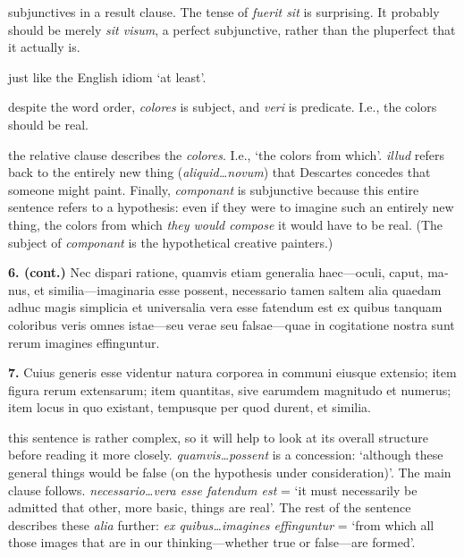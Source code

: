 subjunctives in a result clause. The tense of \textit{fuerit sit} is surprising. It probably should be merely \textit{sit visum}, a perfect subjunctive, rather than the pluperfect that it actually is.

 just like the English idiom `at least'.

 despite the word order, \textit{colores} is subject, and \textit{veri} is predicate. I.e., the colors should be real.

 the relative clause describes the \textit{colores}. I.e., `the colors from which'. \textit{illud} refers back to the entirely new thing (\textit{aliquid\dots novum}) that Descartes concedes that someone might paint. Finally, \textit{componant} is subjunctive because this entire sentence refers to a hypothesis: even if they were to imagine such an entirely new thing, the colors from which \textit{they would compose} it would have to be real. (The subject of \textit{componant} is the hypothetical creative painters.)

\clearpage

\beginnumbering
\pstart
{}
\begin{latin}
    \textenglish{\textbf{6. (cont.)}} Nec dispari ratione, quamvis etiam generalia haec---oculi, caput, manus, et similia---imaginaria esse possent, necessario tamen saltem alia quaedam adhuc magis simplicia et universalia vera esse fatendum est ex quibus tanquam coloribus veris omnes istae---seu verae seu falsae---quae in cogitatione nostra sunt rerum imagines effinguntur.
\end{latin}
\pend
\endnumbering

\beginnumbering
\pstart
\begin{latin}
   \textenglish{\textbf{7.}} Cuius generis esse videntur natura corporea in communi eiusque extensio; item figura rerum extensarum; item quantitas, sive earumdem magnitudo et numerus; item locus in quo existant, tempusque per quod durent, et similia.
\end{latin}
\pend
\endnumbering

\prenotes

 this sentence is rather complex, so it will help to look at its overall structure before reading it more closely. \textit{quamvis\dots possent} is a concession: `although these general things would be false (on the hypothesis under consideration)'. The main clause follows. \textit{necessario\dots vera esse fatendum est} = `it must necessarily be admitted that other, more basic, things are real'. The rest of the sentence describes these \textit{alia} further: \textit{ex quibus\dots imagines effinguntur} = `from which all those images that are in our thinking---whether true or false---are formed'.

